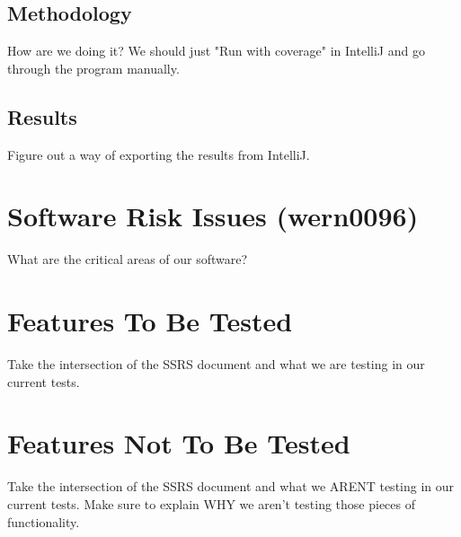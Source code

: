 \documentclass[14pt, a4paper]{article}
\begin{document}
\subsection{Methodology}

How are we doing it? We should just "Run with coverage" in IntelliJ and go through the program manually.

\newpage

\subsection{Results}

Figure out a way of exporting the results from IntelliJ.

\newpage
\section{Software Risk Issues (wern0096)}

What are the critical areas of our software?


\newpage
\section{Features To Be Tested}

Take the intersection of the SSRS document and what we are testing in our current tests.

\newpage
\section{Features Not To Be Tested}


Take the intersection of the SSRS document and what we ARENT testing in our current tests. Make sure to explain WHY we aren't testing those pieces of functionality.
\end{document}
